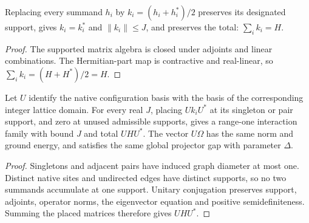 \begin{lemma}
    \label{thm:rectangular_hermitian_terms}
    \leanok
    Replacing every summand $h_i$ by $k_i=(h_i+h_i^*)/2$ preserves its
    designated support, gives $k_i=k_i^*$ and $\|k_i\|\le J$, and preserves
    the total: $\sum_i k_i=H$.
\end{lemma}
\begin{proof}
    \leanok
    The supported matrix algebra is closed under adjoints and linear
    combinations. The Hermitian-part map is contractive and real-linear,
    so $\sum_i k_i=(H+H^*)/2=H$.
\end{proof}

\begin{lemma}
    \label{thm:rectangular_domain_hamiltonian}
    \leanok
    Let $U$ identify the native configuration basis with the basis of the
    corresponding integer lattice domain. For every real $J$, placing $Uk_iU^*$
    at its singleton or pair support, and zero at unused admissible supports,
    gives a range-one interaction family with bound $J$ and total $UHU^*$.
    The vector $U\Omega$ has the same norm and ground energy, and satisfies
    the same global projector gap with parameter $\Delta$.
\end{lemma}
\begin{proof}
    \leanok
    Singletons and adjacent pairs have induced graph diameter at most one.
    Distinct native sites and undirected edges have distinct supports, so no
    two summands accumulate at one support. Unitary conjugation preserves
    support, adjoints, operator norms, the eigenvector equation and positive
    semidefiniteness. Summing the placed matrices therefore gives $UHU^*$.
\end{proof}

